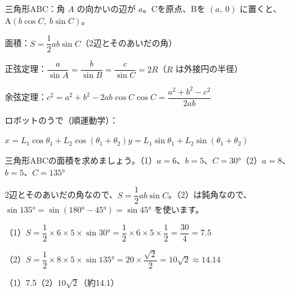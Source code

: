 \begin{taisetsu}
三角形ABC：角 $A$ の向かいの辺が $a$。Cを原点、Bを $(a,\ 0)$ に置くと、$\mathrm{A}(b\cos C,\ b\sin C)$。\par\vspace{3pt}
面積：$S=\dfrac{1}{2}ab\sin C$（2辺とそのあいだの角）\par\vspace{3pt}
正弦定理：$\dfrac{a}{\sin A}=\dfrac{b}{\sin B}=\dfrac{c}{\sin C}=2R$（$R$ は外接円の半径）\par\vspace{3pt}
余弦定理：$c^2=a^2+b^2-2ab\cos C$\qquad $\cos C=\dfrac{a^2+b^2-c^2}{2ab}$\par\vspace{3pt}
ロボットのうで（順運動学）：\par\hspace*{2\zw}$x=L_1\cos\theta_1+L_2\cos(\theta_1+\theta_2)$\quad $y=L_1\sin\theta_1+L_2\sin(\theta_1+\theta_2)$
\end{taisetsu}

\begin{kotoba}
\small
{}
\end{kotoba}


\begin{reidai}[2辺とあいだの角から面積]
三角形ABCの面積を求めましょう。\quad（1）$a=6$、$b=5$、$C=\ang{30}$\quad（2）$a=8$、$b=5$、$C=\ang{135}$\par
\kangaekata 2辺とそのあいだの角なので、$S=\dfrac{1}{2}ab\sin C$。（2）は鈍角なので、$\sin\ang{135}=\sin(\ang{180}-\ang{45})=\sin\ang{45}$ を使います。\par
\shiki（1）$S=\dfrac{1}{2}\times6\times5\times\sin\ang{30}=\dfrac{1}{2}\times6\times5\times\dfrac{1}{2}=\dfrac{30}{4}=7.5$\par
\hspace*{2.6\zw}（2）$S=\dfrac{1}{2}\times8\times5\times\sin\ang{135}=20\times\dfrac{\sqrt2}{2}=10\sqrt2\approx14.14$\par
\kotae（1）7.5\quad（2）$10\sqrt2$（約14.1）
\end{reidai}


